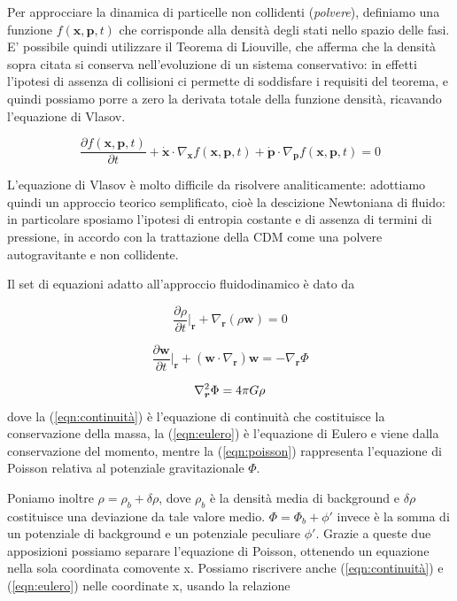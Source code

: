 Per approcciare la dinamica di particelle non collidenti (\textit{polvere}), definiamo una funzione $f(\bm{x}, \bm{p}, t)$ 
che corrisponde alla densità degli stati nello spazio delle fasi. E' possibile quindi utilizzare il Teorema di 
Liouville, che afferma che la densità sopra citata si conserva nell'evoluzione di un sistema conservativo: in
effetti l'ipotesi di assenza di collisioni ci permette di soddisfare i requisiti del teorema, e quindi 
possiamo porre a zero la derivata totale della funzione densità, ricavando l'equazione di Vlasov.

\begin{equation}
    \label{eqn:vlasov}
    \frac{\partial f(\bm{x}, \bm{p},t)}{\partial t} + \dot{\bm{x}} \cdot \nabla_{\bm{x}}f(\bm{x}, \bm{p},t) + \dot{\bm{p}} \cdot \nabla_{\bm{p}}f(\bm{x}, \bm{p},t)  = 0
\end{equation}

L'equazione di Vlasov è molto difficile da risolvere analiticamente: adottiamo quindi un approccio 
teorico semplificato, cioè la descizione Newtoniana di fluido: in particolare sposiamo l'ipotesi 
di entropia costante e di assenza di termini di pressione, in accordo con la trattazione della CDM come 
una polvere autogravitante e non collidente.

Il set di equazioni adatto all'approccio fluidodinamico è dato da

\begin{equation}
    \label{eqn:continuità}
    \frac{\partial\rho}{\partial t}\biggr|_{\bm{r}} + \nabla_{\bm{r}}(\rho \bm{w}) = 0
\end{equation}

\begin{equation}
    \label{eqn:eulero}
    \frac{\partial\bm{w}}{\partial t}\biggr|_{\bm{r}} + (\bm{w}\cdot\nabla_{\bm{r}})\bm{w} = - \nabla_{\bm{r}} \Phi
\end{equation}

\begin{equation}
    \label{eqn:poisson}
    \laplacian_{\bm{r}}\Phi = 4\pi G \rho
\end{equation}
dove la (\ref{eqn:continuità}) è l'equazione di continuità che costituisce la conservazione
della massa, la (\ref{eqn:eulero}) è l'equazione di Eulero e viene dalla conservazione del
momento, mentre la (\ref{eqn:poisson}) rappresenta l'equazione di Poisson relativa
al potenziale gravitazionale $\Phi$.

Poniamo inoltre $\rho = \rho_b + \delta\rho$, dove $\rho_b$ è la densità media di background
e $\delta\rho$ costituisce una deviazione da tale valore medio. $\Phi = \Phi_b + \phi{'}$ invece
è la somma di un potenziale di background e un potenziale peculiare $\phi{'}$. Grazie a queste due 
apposizioni possiamo separare l'equazione di Poisson, ottenendo un equazione nella sola coordinata
comovente x.
Possiamo riscrivere anche (\ref{eqn:continuità}) e (\ref{eqn:eulero}) nelle coordinate x, usando la
relazione

